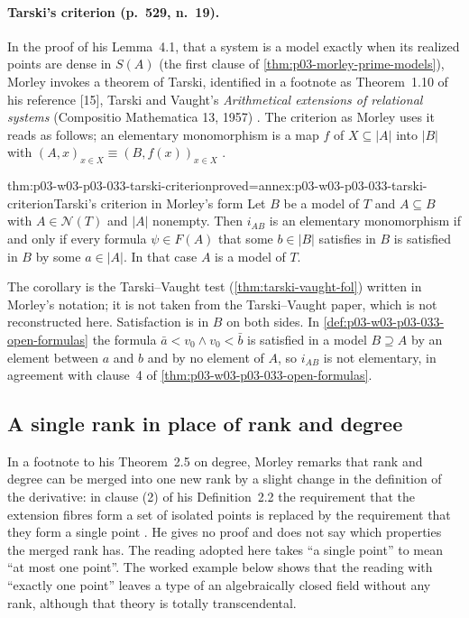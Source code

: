 \paragraph{Tarski's criterion (p.~529, n.~19).} In the proof of his
Lemma~4.1, that a system is a model exactly when its realized points are
dense in \(S(A)\) (the first clause of \cref{thm:p03-morley-prime-models}),
Morley invokes a theorem of Tarski, identified in a footnote as
Theorem~1.10 of his reference [15], Tarski and Vaught's
\emph{Arithmetical extensions of relational systems} (Compositio
Mathematica 13, 1957) \cite[p.~529, n.~19; p.~538]{Morley1965}. The
criterion as Morley uses it reads as follows; an elementary monomorphism is
a map \(f\) of \(X\subseteq|A|\) into \(|B|\) with
\((A,x)_{x\in X}\equiv(B,f(x))_{x\in X}\) \cite[p.~517]{Morley1965}.

\begin{hbcorollary}{thm:p03-w03-p03-033-tarski-criterion}{proved=annex:p03-w03-p03-033-tarski-criterion}{Tarski's criterion in Morley's form}
Let \(B\) be a model of \(T\) and \(A\subseteq B\) with
\(A\in\mathcal N(T)\) and \(|A|\) nonempty. Then \(i_{AB}\) is an elementary monomorphism if
and only if every formula \(\psi\in F(A)\) that some \(b\in|B|\)
satisfies in \(B\) is satisfied in \(B\) by some \(a\in|A|\). In that case
\(A\) is a model of \(T\).
\end{hbcorollary}

The corollary is the Tarski--Vaught test (\cref{thm:tarski-vaught-fol})
written in Morley's notation; it is not taken from the Tarski--Vaught
paper, which is not reconstructed here. Satisfaction is in \(B\) on both
sides. In \cref{def:p03-w03-p03-033-open-formulas} the formula
\(\bar a<v_0\wedge v_0<\bar b\) is satisfied in a model \(B\supseteq A\)
by an element between \(a\) and \(b\) and by no element of \(A\), so
\(i_{AB}\) is not elementary, in agreement with clause~4 of
\cref{thm:p03-w03-p03-033-open-formulas}.

\subsection{A single rank in place of rank and degree}
\label{sec:p03-w03-p03-033-variant-rank}

In a footnote to his Theorem~2.5 on degree, Morley remarks that rank and degree can
be merged into one new rank by a slight change in the definition of the
derivative: in clause (2) of his Definition~2.2 the requirement that the
extension fibres form a set of isolated points is replaced by the
requirement that they form a single point
\cite[p.~521, n.~13]{Morley1965}. He gives no proof and does not say which
properties the merged rank has. The reading adopted here takes ``a single
point'' to mean ``at most one point''. The worked example below shows that
the reading with ``exactly one point'' leaves a type of an algebraically
closed field without any rank, although that theory is totally
transcendental.

